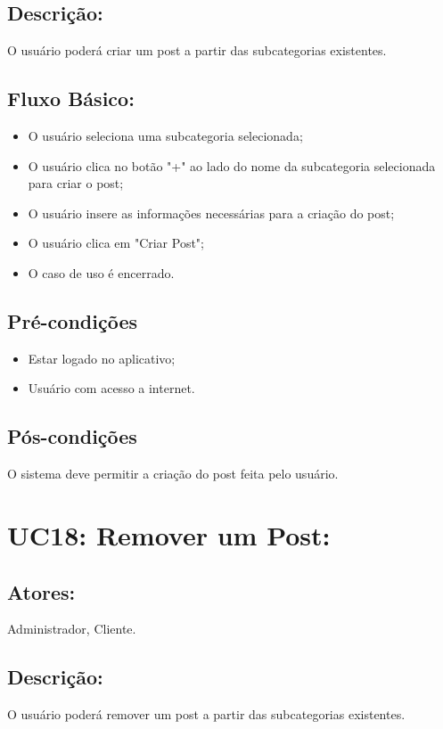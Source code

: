 \subsection{Descrição:}
O usuário poderá criar um post a partir das subcategorias existentes. 
\subsection{Fluxo Básico:}

\begin{itemize}
    \item O usuário seleciona uma subcategoria selecionada;
    \item O usuário clica no botão "+" ao lado do nome da subcategoria selecionada para criar o post;
    \item O usuário insere as informações necessárias para a criação do post;
    \item O usuário clica em "Criar Post"; 
    \item O caso de uso é encerrado. 
\end{itemize}

\subsection{Pré-condições}
\begin{itemize}
    \item  Estar logado no aplicativo;
    \item Usuário com acesso a internet. 
\end{itemize}

\subsection{Pós-condições}
O sistema deve permitir a criação do post feita pelo usuário. 
\section{UC18: Remover um Post:  }

\subsection{Atores:}
 Administrador, Cliente. 
\subsection{Descrição:}
O usuário poderá remover um post a partir das subcategorias existentes. 
